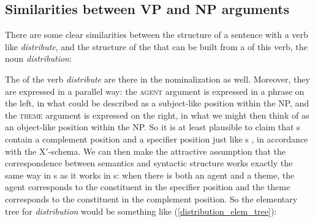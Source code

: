 \documentclass{article}
\begin{document}
    \subsection{Similarities between VP and NP arguments}
There are some clear similarities between the structure of a sentence with a verb like \emph{distribute}, and the structure of the  that can be built from a  of this verb, the noun \emph{distribution}:
\begin{exe}
\end{exe}
The  of the verb \emph{distribute} are there in the nominalization as well.
Moreover, they are expressed in a parallel way: the \textsc{agent} argument is expressed in a phrase on the left, in what could be described  as a  subject-like position within the NP, and the \textsc{theme} argument is expressed on the right, in what we might then think of as an object-like position within the NP.
So it is at least plausible to claim that s contain a complement position and a specifier position just like s , in accordance with the X$'$-schema.
We can then make the attractive assumption that the correspondence between semantics and syntactic structure works exactly the same way in s as it works in s: when there is both an agent and a theme, the agent corresponds to the constituent in the specifier position and the theme corresponds to the constituent in the complement position. 
So the elementary tree for \emph{distribution} would be something like (\ref{distribution_elem_tree}):
\begin{exe}
    \label{distribution_elem_tree}
\end{exe}
\end{document}
